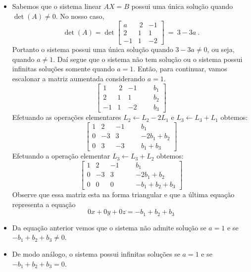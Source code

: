\begin{solution}
\begin{itemize}
\item[(a)] Sabemos que o sistema linear $AX=B$ possui uma única solução quando \linebreak $\det(A) \neq 0$. No nosso caso,
$$ \det(A) = \det\left[\begin{array}{rrr}
  a & \ 2 &  -1  \\
  2 &   1 &   1  \\ 
 -1 &   1 &  -2  \end{array}\right]\ =\ 3-3a\ . $$
Portanto o sistema possui uma única solução quando $3-3a \neq 0$, ou seja, quando $a\neq 1$. Daí segue que o sistema não tem solução ou o sistema possui infinitas soluções somente quando $a=1$. Então, para continuar, vamos escalonar a matriz aumentada considerando $a=1$.
$$ \left[\begin{array}{rrrr|rc}
  1 & \ 2 &  -1   & & &   b_1    \\
  2 &   1 &   1   & & &   b_2    \\ 
 -1 &   1 &  -2   & & &   b_3  \end{array}\right] $$
Efetuando as operações elementares $L_2 \leftarrow L_2 - 2L_1$ e $L_3 \leftarrow L_3 + L_1$ obtemos:
$$ \left[\begin{array}{rrrr|rc}
  1 &   2 &  -1   & & &   b_1    \\
  0 &  -3 &   3   & & &   -2b_1 + b_2    \\ 
  0 &   3 &  -3   & & &   b_1 + b_3  \end{array}\right] $$
Efetuando a operação elementar $L_3 \leftarrow L_3 + L_2$ obtemos:
$$ \left[\begin{array}{rrrr|rc}
  1 &   2 &  -1   & & &   b_1    \\
  0 &  -3 &   3   & & &   -2b_1 + b_2    \\ 
  0 &   0 &   0   & & &   -b_1 + b_2 + b_3  \end{array}\right] $$
Observe que essa matriz esta na forma triangular e que a última equação representa a equação
$$0x + 0y + 0z = -b_1 + b_2 + b_3$$


\item[(b)] Da equação anterior vemos que o sistema não admite solução se $a=1$ e se \linebreak $-b_1+b_2+b_3 \neq 0$.

\item[(c)] De modo análogo, o sistema possui infinitas soluções se $a=1$ e se $-b_1+b_2+b_3 = 0$.


\end{itemize}
\end{solution}
